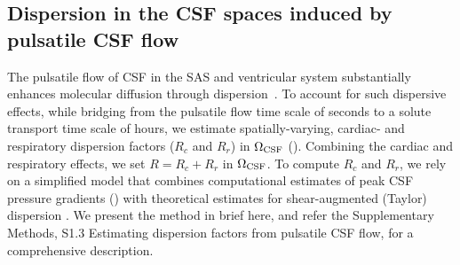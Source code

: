 \documentclass[fleqn,10pt]{wlscirep}
\begin{document}

\subsection*{Dispersion in the CSF spaces induced by pulsatile CSF flow}

The pulsatile flow of CSF in the SAS and ventricular system
substantially enhances molecular diffusion through
dispersion~\cite{taylor1953dispersion, watson1983diffusion,
  asgari2016glymphatic, sharp2019dispersion, ray2021quantitative,
  troyetsky2021dispersion}. To account for such dispersive effects,
while bridging from the pulsatile flow time scale of seconds to a
solute transport time scale of hours, we estimate spatially-varying,
cardiac- and respiratory dispersion factors ($R_c$ and $R_r$) in
$\Omega_{\rm CSF}$ (). Combining the cardiac and
respiratory effects, we set $R = R_c + R_r$ in $\Omega_{\rm CSF}$. To
compute $R_c$ and $R_r$, we rely on a simplified model that combines
computational estimates of peak CSF pressure gradients
() with theoretical estimates for shear-augmented
(Taylor) dispersion \cite{taylor1953dispersion, watson1983diffusion,
  sharp2019dispersion}. We present the method in brief here, and refer
the Supplementary Methods, S1.3 Estimating dispersion factors from
pulsatile CSF flow, for a comprehensive description.
\end{document}
